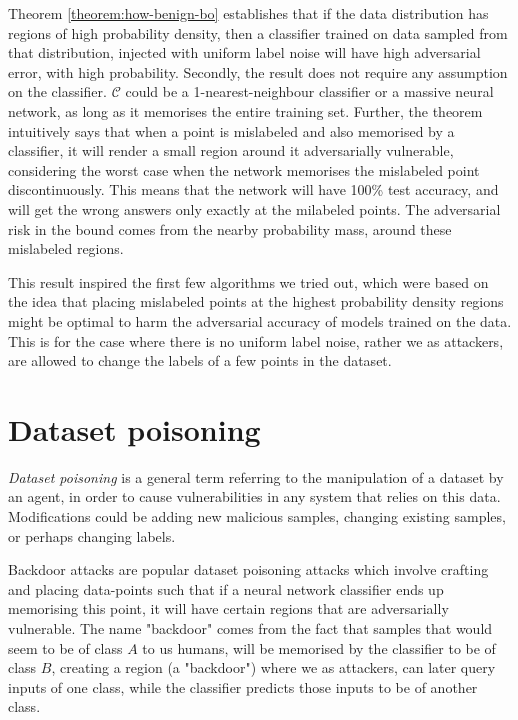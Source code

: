 \documentclass[12pt, oneside]{book}
\begin{document}
Theorem \ref{theorem:how-benign-bo} establishes that if the data distribution
has regions of high probability density, then a classifier trained on data
sampled from that distribution, injected with uniform label noise will have high
adversarial error, with high probability. Secondly, the result does not require
any assumption on the classifier. $\mathcal{C}$ could be a 1-nearest-neighbour
classifier or a massive neural network, as long as it memorises the entire
training set. Further, the theorem intuitively says that when a point is
mislabeled and also memorised by a classifier, it will render a small region
around it adversarially vulnerable, considering the worst case when the network
memorises the mislabeled point discontinuously. This means that the network will
have 100\% test accuracy, and will get the wrong answers only exactly at the
milabeled points. The adversarial risk in the bound comes from the nearby
probability mass, around these mislabeled regions.


This result inspired the first few algorithms we tried out, which were based on
the idea that placing mislabeled points at the highest probability density
regions might be optimal to harm the adversarial accuracy of models trained on
the data. This is for the case where there is no uniform label noise, rather we
as attackers, are allowed to change the labels of a few points in the dataset.


\section{Dataset poisoning}
\emph{Dataset poisoning} \citep{just-how-toxic,
DBLP:journals/corr/abs-1712-05526} is a general term referring to the
manipulation of a dataset by an agent, in order to cause vulnerabilities in any
system that relies on this data. Modifications could be adding new malicious
samples, changing existing samples, or perhaps changing labels.

Backdoor attacks
\citep{DBLP:journals/corr/abs-1712-05526,hidden-trigger-backdoor,transferable-clean-label-poisoning}
are popular dataset poisoning attacks which involve crafting and placing
data-points such that if a neural network classifier ends up memorising this
point, it will have certain regions that are adversarially vulnerable. The name
"backdoor" comes from the fact that samples that would seem to be of class $A$
to us humans, will be memorised by the classifier to be of class $B$, creating a
region (a "backdoor") where we as attackers, can later query inputs of one
class, while the classifier predicts those inputs to be of another class.
\end{document}
